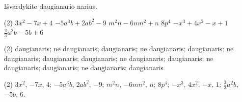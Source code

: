\documentclass[11pt,a4paper]{scrartcl}
\begin{document}
\begin{problem}
Išvardykite daugianario narius.
\begin{tasks}[label={(\arabic*)}, label-offset=0.9em](2)
	\task $3x^2-7x+4$
	\task $-5a^3b+2ab^2-9$
	\task $m^2n-6mn^2+n$
	\task $8p^4$
	\task $-x^3+4x^2-x+1$
	\task $\frac{2}{3}a^2b-5b+6$
\end{tasks}
\end{problem}

\newpage
\answerssection

\begin{problem} \phantom{text}
\begin{tasks}[label={(\arabic*)}, label-offset=0.9em](2)
	\task daugianaris;
	\task ne daugianaris;
	\task daugianaris;
	\task ne daugianaris;
	\task daugianaris;
	\task ne daugianaris;
	\task daugianaris;
	\task daugianaris;
	\task ne daugianaris;
	\task daugianaris;
	\task ne daugianaris;
	\task daugianaris;
	\task ne daugianaris;
	\task daugianaris.
\end{tasks}
\end{problem}

\begin{problem} \phantom{text}
\begin{tasks}[label={(\arabic*)}, label-offset=0.9em](2)
	\task $3x^2$, $-7x$, $4$;
	\task $-5a^3b$, $2ab^2$, $-9$;
	\task $m^2n$, $-6mn^2$, $n$;
	\task $8p^4$;
	\task $-x^3$, $4x^2$, $-x$, $1$;
	\task $\frac{2}{3}a^2b$, $-5b$, $6$.
\end{tasks}
\end{problem}
\end{document}
